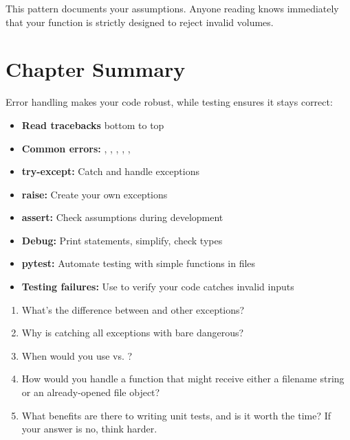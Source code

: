 This pattern documents your assumptions. Anyone reading  knows immediately that your function is strictly designed to reject invalid volumes.


\section{Chapter Summary}
\label{sec:errors-summary}

Error handling makes your code robust, while testing ensures it stays correct:

\begin{itemize}
    \item \textbf{Read tracebacks} bottom to top
    \item \textbf{Common errors:} , , , , , 
    \item \textbf{try-except:} Catch and handle exceptions
    \item \textbf{raise:} Create your own exceptions
    \item \textbf{assert:} Check assumptions during development
    \item \textbf{Debug:} Print statements, simplify, check types
    \item \textbf{pytest:} Automate testing with simple functions in  files
    \item \textbf{Testing failures:} Use  to verify your code catches invalid inputs
\end{itemize}

\begin{ponder}
\begin{enumerate}
    \item What's the difference between  and other exceptions?
    \item Why is catching all exceptions with bare  dangerous?
    \item When would you use  vs. ?
    \item How would you handle a function that might receive either a filename string or an already-opened file object?
    \item What benefits are there to writing unit tests, and is it worth the time? If your answer is no, think harder.
\end{enumerate}
\end{ponder}
